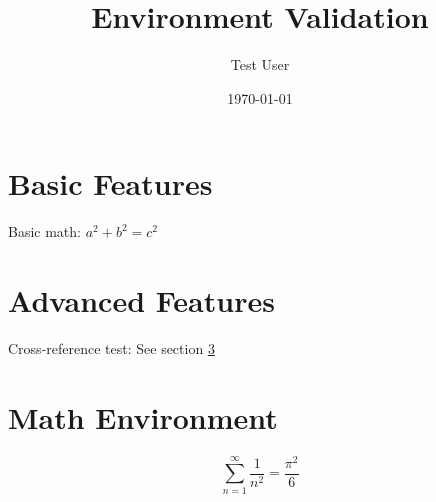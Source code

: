 \documentclass{article}
\title{Environment Validation}
\author{Test User}
\date{\today}
\begin{document}
\maketitle

\section{Basic Features}
Basic math: $a^2 + b^2 = c^2$

\section{Advanced Features}
Cross-reference test: See section \ref{sec:math}

\section{Math Environment}\label{sec:math}
\begin{equation}
  \sum_{n=1}^{\infty} \frac{1}{n^2} = \frac{\pi^2}{6}
\end{equation}
\end{document}
